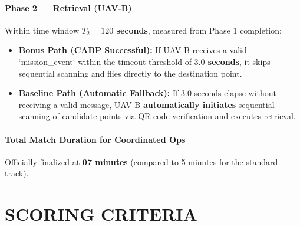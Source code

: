\documentclass[12pt,a4paper]{article}
\begin{document}
\paragraph{Phase 2 — Retrieval (UAV-B)}
Within time window \textbf{$T_2 = 120$ seconds}, measured from Phase 1 completion:
\begin{itemize}
\item \textbf{Bonus Path (CABP Successful):} If UAV-B receives a valid `mission\_event` within the timeout threshold of \textbf{$3.0$ seconds}, it skips sequential scanning and flies directly to the destination point.
\item \textbf{Baseline Path (Automatic Fallback):} If 3.0 seconds elapse without receiving a valid message, UAV-B \textbf{automatically initiates} sequential scanning of candidate points via QR code verification and executes retrieval.
\end{itemize}

\paragraph{Total Match Duration for Coordinated Ops}
Officially finalized at \textbf{07 minutes} (compared to 5 minutes for the standard track).

\section{SCORING CRITERIA}
\end{document}
